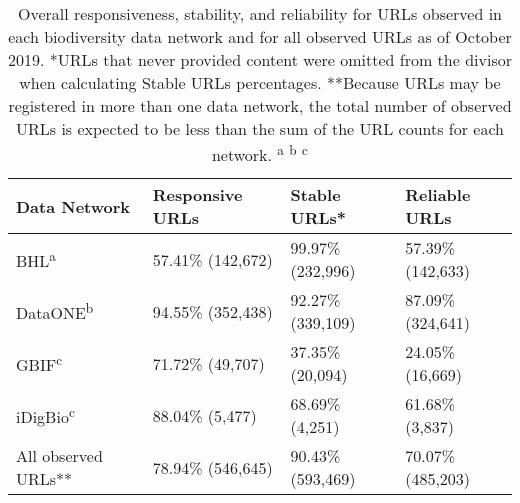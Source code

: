 \begin{table}[!ht]
\begin{adjustwidth}{0in}{0in} %
\centering
\begin{tabular}{llll}
\hline
{\bf Data Network} & {\bf Responsive URLs} & {\bf Stable URLs*} & {\bf Reliable URLs} \\ \hline
BHL\textsuperscript{a} & 57.41\% (142,672) & 99.97\% (232,996) & 57.39\% (142,633) \\
DataONE\textsuperscript{b} & 94.55\% (352,438) & 92.27\% (339,109) & 87.09\% (324,641) \\
GBIF\textsuperscript{c} & 71.72\% (49,707) & 37.35\% (20,094) & 24.05\% (16,669) \\
iDigBio\textsuperscript{c} & 88.04\% (5,477) & 68.69\% (4,251) & 61.68\% (3,837)  \\
All observed URLs** & 78.94\% (546,645) & 90.43\% (593,469) & 70.07\% (485,203) \\ \hline
\end{tabular}
\caption{Overall responsiveness, stability, and reliability for URLs observed in each biodiversity data network and for all observed URLs as of October 2019.
*URLs that never provided content were omitted from the divisor when calculating Stable URLs percentages.
**Because URLs may be registered in more than one data network, the total number of observed URLs is expected to be less than the sum of the URL counts for each network.
\textsuperscript{a}\citet{poelen_jorrit_h_2019_3484555}
\textsuperscript{b}\citet{poelen_jorrit_h_2019_3483218}
\textsuperscript{c}\citet{poelen_jorrit_h_2019_3484205}
}
\label{table1}
\end{adjustwidth}
\end{table}
